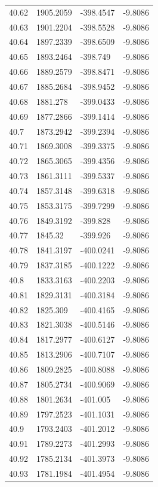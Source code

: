 \begin{table}[H]
\begin{tabular}{llll}
40.62 & 1905.2059 & -398.4547 & -9.8086 \\
40.63 & 1901.2204 & -398.5528 & -9.8086 \\
40.64 & 1897.2339 & -398.6509 & -9.8086 \\
40.65 & 1893.2464 & -398.749 & -9.8086 \\
40.66 & 1889.2579 & -398.8471 & -9.8086 \\
40.67 & 1885.2684 & -398.9452 & -9.8086 \\
40.68 & 1881.278 & -399.0433 & -9.8086 \\
40.69 & 1877.2866 & -399.1414 & -9.8086 \\
40.7 & 1873.2942 & -399.2394 & -9.8086 \\
40.71 & 1869.3008 & -399.3375 & -9.8086 \\
40.72 & 1865.3065 & -399.4356 & -9.8086 \\
40.73 & 1861.3111 & -399.5337 & -9.8086 \\
40.74 & 1857.3148 & -399.6318 & -9.8086 \\
40.75 & 1853.3175 & -399.7299 & -9.8086 \\
40.76 & 1849.3192 & -399.828 & -9.8086 \\
40.77 & 1845.32 & -399.926 & -9.8086 \\
40.78 & 1841.3197 & -400.0241 & -9.8086 \\
40.79 & 1837.3185 & -400.1222 & -9.8086 \\
40.8 & 1833.3163 & -400.2203 & -9.8086 \\
40.81 & 1829.3131 & -400.3184 & -9.8086 \\
40.82 & 1825.309 & -400.4165 & -9.8086 \\
40.83 & 1821.3038 & -400.5146 & -9.8086 \\
40.84 & 1817.2977 & -400.6127 & -9.8086 \\
40.85 & 1813.2906 & -400.7107 & -9.8086 \\
40.86 & 1809.2825 & -400.8088 & -9.8086 \\
40.87 & 1805.2734 & -400.9069 & -9.8086 \\
40.88 & 1801.2634 & -401.005 & -9.8086 \\
40.89 & 1797.2523 & -401.1031 & -9.8086 \\
40.9 & 1793.2403 & -401.2012 & -9.8086 \\
40.91 & 1789.2273 & -401.2993 & -9.8086 \\
40.92 & 1785.2134 & -401.3973 & -9.8086 \\
40.93 & 1781.1984 & -401.4954 & -9.8086 \\

\end{tabular}
\end{table}

